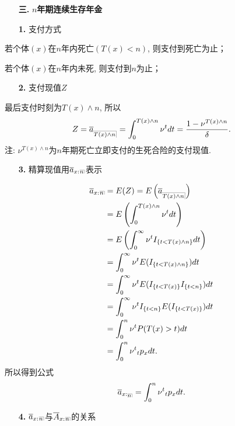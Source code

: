 \documentclass[a4paper,openany, 10pt]{ctexbook}
\makeatletter
\newcommand{\hei}{\CJKfamily{hei}}      %
\def\z{\left}
\def\y{\right}
\DeclareRobustCommand{\annu}[1]{_{%
    \def\arraystretch{0}%
    \setlength\arraycolsep{1pt}%
    \setlength\arrayrulewidth{.2pt}%
    \begin{array}[b]{@{}c|}\hline
        \\[\arraycolsep]%
        \scriptstyle #1%
    \end{array}%
}}
\makeatother
\begin{document}
\begin{itemize}
    \item[{\bf\hei 三.}]{\bf\hei $n$年期连续生存年金}
\end{itemize}

\begin{itemize}
    \item[{\bf\hei 1.}] 支付方式
\end{itemize}

若个体$(x)$在$n$年内死亡$(T(x)<n)$, 则支付到死亡为止；

若个体$(x)$在$n$年内未死, 则支付到$n$为止；

\begin{itemize}
    \item[{\bf\hei 2.}] 支付现值$Z$
\end{itemize}
最后支付时刻为$T(x)\wedge n$, 所以$$Z = \overline{a}_{\annu{T(x)\wedge n}} = \int_0^{T(x)\wedge n} \nu^tdt = \frac{1-\nu^{T(x)\wedge n}}{\delta}.$$
注: $\nu^{T(x)\wedge n}$为$n$年期死亡立即支付的生死合险的支付现值.
\begin{itemize}
    \item[{\bf\hei 3.}] 精算现值用$\overline{a}_{x:}{}\annu{n}$表示
\end{itemize}

\begin{align*}
    \overline{a}_{x:}{}\annu{n} & = E(Z)=E\z(\overline{a}_{\annu{T(x)\wedge n}}\y)\\
     &= E\z(\int_0^{T(x)\wedge n} \nu^tdt\y) \\
                   & = E\z(\int_0^{\infty} \nu^tI_{\{t < T(x)\wedge n\}}dt\y)            \\
                    & = \int_0^{\infty} \nu^tE(I_{\{t < T(x)\wedge n\}})dt           \\
                     & = \int_0^{\infty} \nu^tE(I_{\{t< T(x)\} } I_{\{t<n\}})dt           \\
                     & = \int_0^{\infty} \nu^tI_{\{t<n\}} E(I_{\{t< T(x)\} })dt           \\
                     & = \int_0^{n} \nu^tP(T(x) >t )dt                    \\
                   & = \int_0^{n} \nu^t{}_{t}p_xdt.
\end{align*}
所以得到公式$$\overline{a}_{x:\annu{n}}= \int_0^{n} \nu^t{}_{t}p_xdt.$$
\begin{itemize}
    \item[{\bf\hei 4.}] $\overline{a}_{x:}{}\annu{n}$与$\overline{A}_{x:}{}\annu{n}$的关系
\end{itemize}
\end{document}
